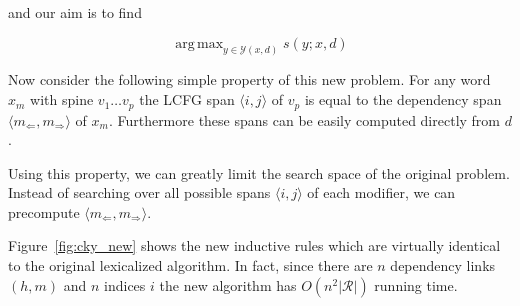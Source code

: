 \documentclass[11pt,letterpaper]{article}
\DeclareMathOperator*{\argmax}{arg\,max}
\newcommand{\rules}{\mathcal{R}}
\newcommand{\Left}[1]{#1_{\Leftarrow}}
\newcommand{\Right}[1]{#1_{\Rightarrow}}
\newcommand{\Span}[1]{\langle #1 \rangle}
\begin{document}



\noindent and our aim is to find

\[ \argmax_{y \in \mathcal{Y}(x, d)} s(y; x, d)\]

Now consider the following simple property of this new problem. For any word $x_m$ with spine $v_1 \ldots v_p$ the LCFG span  $\Span{i,j}$ of $v_p$ is equal to the dependency span $\langle \Left{m},\Right{m}\rangle$ of $x_m$. Furthermore these spans can be easily computed directly from $d$.

Using this property, we can greatly limit the search space of the original problem.
Instead of searching over all possible spans $\Span{i, j}$ of each modifier, we can
precompute $\langle \Left{m},\Right{m}\rangle$.  

Figure~\ref{fig:cky_new} shows the new inductive rules which are
virtually identical to the original lexicalized algorithm.
In fact, since there are $n$ dependency links $(h, m)$ and $n$ indices $i$ the new algorithm has $O(n^2|\rules|)$ running time.







% 


\end{document}
